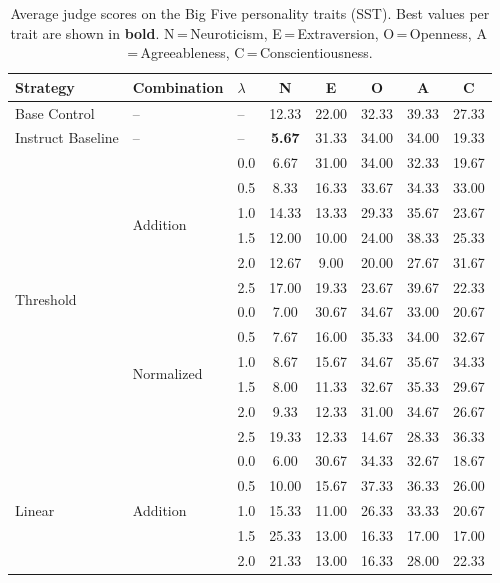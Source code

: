 \begin{table}[htbp]
  \centering
  \caption{Average judge scores on the Big Five personality traits (SST). Best values per trait are shown in \textbf{bold}. N\,=\,Neuroticism, E\,=\,Extraversion, O\,=\,Openness, A\,=\,Agreeableness, C\,=\,Conscientiousness.}
  \label{tab:sst_scores}
  \small
  \begin{tabular}{lll ccccc}
    \toprule
    Strategy & Combination & $\lambda$ & N & E & O & A & C \\
    \midrule
    Base Control & -- & -- & 12.33 & 22.00 & 32.33 & 39.33 & 27.33 \\
    Instruct Baseline & -- & -- & \textbf{5.67} & 31.33 & 34.00 & 34.00 & 19.33 \\
    \midrule
    \multirow{12}{*}{Threshold} & \multirow{6}{*}{Addition} & 0.0 & 6.67 & 31.00 & 34.00 & 32.33 & 19.67 \\
     &  & 0.5 & 8.33 & 16.33 & 33.67 & 34.33 & 33.00 \\
     &  & 1.0 & 14.33 & 13.33 & 29.33 & 35.67 & 23.67 \\
     &  & 1.5 & 12.00 & 10.00 & 24.00 & 38.33 & 25.33 \\
     &  & 2.0 & 12.67 & 9.00 & 20.00 & 27.67 & 31.67 \\
     &  & 2.5 & 17.00 & 19.33 & 23.67 & 39.67 & 22.33 \\
    \cmidrule(lr){2-8}
     & \multirow{6}{*}{Normalized} & 0.0 & 7.00 & 30.67 & 34.67 & 33.00 & 20.67 \\
     &  & 0.5 & 7.67 & 16.00 & 35.33 & 34.00 & 32.67 \\
     &  & 1.0 & 8.67 & 15.67 & 34.67 & 35.67 & 34.33 \\
     &  & 1.5 & 8.00 & 11.33 & 32.67 & 35.33 & 29.67 \\
     &  & 2.0 & 9.33 & 12.33 & 31.00 & 34.67 & 26.67 \\
     &  & 2.5 & 19.33 & 12.33 & 14.67 & 28.33 & 36.33 \\
    \midrule
    \multirow{12}{*}{Linear} & \multirow{6}{*}{Addition} & 0.0 & 6.00 & 30.67 & 34.33 & 32.67 & 18.67 \\
     &  & 0.5 & 10.00 & 15.67 & 37.33 & 36.33 & 26.00 \\
     &  & 1.0 & 15.33 & 11.00 & 26.33 & 33.33 & 20.67 \\
     &  & 1.5 & 25.33 & 13.00 & 16.33 & 17.00 & 17.00 \\
     &  & 2.0 & 21.33 & 13.00 & 16.33 & 28.00 & 22.33 \\

\end{tabular}
\end{table}
